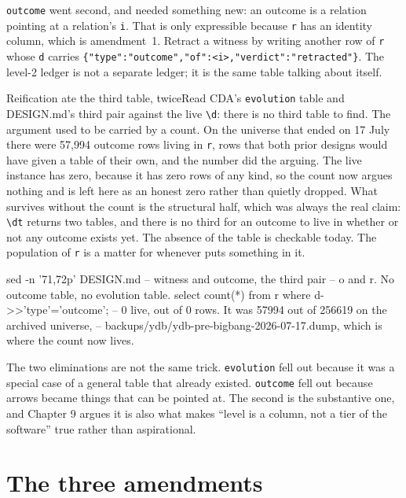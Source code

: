 \texttt{outcome} went second, and needed something new: an outcome is a relation pointing at a relation's \texttt{i}. That is only expressible because \texttt{r} has an identity column, which is amendment~1. Retract a witness by writing another row of \texttt{r} whose \texttt{d} carries \texttt{\{"type":"outcome","of":<i>,"verdict":"retracted"\}}. The level-2 ledger is not a separate ledger; it is the same table talking about itself.

\begin{Correspondence}{Reification ate the third table, twice}{Read CDA's \texttt{evolution} table and DESIGN.md's third pair against the live \texttt{\textbackslash d}: there is no third table to find.}
The argument used to be carried by a count. On the universe that ended on 17 July there were 57,994 outcome rows living in \texttt{r}, rows that both prior designs would have given a table of their own, and the number did the arguing. The live instance has zero, because it has zero rows of any kind, so the count now argues nothing and is left here as an honest zero rather than quietly dropped. What survives without the count is the structural half, which was always the real claim: \texttt{\textbackslash dt} returns two tables, and there is no third for an outcome to live in whether or not any outcome exists yet. The absence of the table is checkable today. The population of \texttt{r} is a matter for whenever \labPI{} puts something in it.
\begin{Check}
sed -n '71,72p' DESIGN.md   -- witness and outcome, the third pair
\dt                         -- o and r. No outcome table, no evolution table.
select count(*) from r where d->>'type'='outcome';
--   0 live, out of 0 rows. It was 57994 out of 256619 on the archived universe,
--   backups/ydb/ydb-pre-bigbang-2026-07-17.dump, which is where the count now lives.
\end{Check}
The two eliminations are not the same trick. \texttt{evolution} fell out because it was a special case of a general table that already existed. \texttt{outcome} fell out because arrows became things that can be pointed at. The second is the substantive one, and Chapter 9 argues it is also what makes ``level is a column, not a tier of the software'' true rather than aspirational.
\end{Correspondence}

\section{The three amendments}


